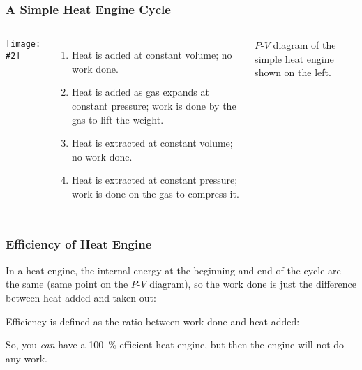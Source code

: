 \documentclass[12pt,aspectratio=169]{beamer}
\newcommand{\pic}[2]{\texttt{[image: \#2]}}
\newcommand{\eq}[2]{\vspace{#1}{\Large\begin{displaymath}#2\end{displaymath}}}
\begin{document}
\begin{frame}
  \frametitle{A Simple Heat Engine Cycle}
  \begin{columns}
    \begin{center}
      \pic{.5}{heat-engine.jpg}
    \end{center}
    \begin{enumerate}
    \item\vspace{-.15in} Heat is added at constant volume; no work done.
    \item Heat is added as gas expands at constant pressure; work is done by
      the gas to lift the weight.
    \item Heat is extracted at constant volume; no work done.
    \item Heat is extracted at constant pressure; work is done on the gas to
      compress it.
    \end{enumerate}

    {\footnotesize $P$-$V$ diagram of the simple heat engine shown on the left.
      \par}
  \end{columns}
\end{frame}


\begin{frame}
  \frametitle{Efficiency of Heat Engine}
  In a heat engine, the internal energy at the beginning and end of the cycle
  are the same (same point on the $P$-$V$ diagram), so the work done is just
  the difference between heat added and taken out:
  
  \eq{-.25in}{
    W = Q_\mathrm{in}-Q_\mathrm{out}
  }
  
  \vspace{-.15in}Efficiency is defined as the ratio between work done and heat
  added:

  \eq{-.25in}{
    \boxed{\eta =\frac{W}{Q_\mathrm{in}}=1-\frac{Q_\mathrm{out}}{Q_\mathrm{in}}}
  }

  So, you \emph{can} have a \SI{100}{\percent} efficient heat engine, but then
  the engine will not do any work.
\end{frame}
\end{document}
